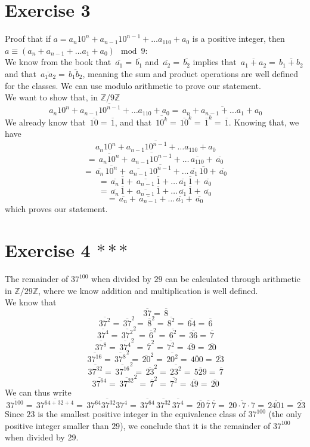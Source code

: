 \documentclass[12pt]{article}
\newcommand{\Z}{\mathbb{Z}}
\newcommand{\olsi}[1]{\,\overline{{#1}}}
\begin{document}
    \section*{Exercise 3}
    Proof that if $a = a_n10^n + a_{n-1}10^{n-1} + \dots a_110 + a_0$
    is a positive integer,
    then $a \equiv (a_n + a_{n-1} + \dots a_1 + a_0) \mod 9$: \\
    We know from the book that $\olsi{a_1} = \olsi{b_1}$
    and $\olsi{a_2} = \olsi{b_2}$
    implies that $\olsi{a_1+a_2} = \olsi{b_1 + b_2}$
    and that $\olsi{a_1a_2} = \olsi{b_1b_2}$,
    meaning the sum and product operations are well defined
    for the classes.
    We can use modulo arithmetic to prove our statement. \\
    We want to show that, in $\Z/9\Z$
    \[  \olsi{a_n10^n + a_{n-1}10^{n-1} + \dots a_110 + a_0}
    = \olsi{a_n + a_{n-1} + \dots a_1 + a_0} \]
    We already know that $\olsi{10} = \olsi{1}$,
    and that $\olsi{10^k} = \olsi{10}^k = \olsi{1}^k = \olsi{1}$.
    Knowing that, we have
    \[  \olsi{a_n10^n + a_{n-1}10^{n-1} + \dots a_110 + a_0} \]
    \[ = \olsi{a_n10^n} +  \olsi{a_{n-1}10^{n-1}}
    + \dots  \olsi{a_110} +  \olsi{a_0} \]
    \[ = \olsi{a_n}\olsi{10^n} +  \olsi{a_{n-1}}\olsi{10^{n-1}}
    + \dots  \olsi{a_1}\olsi{10} +  \olsi{a_0} \]
    \[ = \olsi{a_n}\olsi{1} +  \olsi{a_{n-1}}\olsi{1}
    + \dots  \olsi{a_1}\olsi{1} +  \olsi{a_0} \]
    \[ = \olsi{a_n}\olsi{1} +  \olsi{a_{n-1}}\olsi{1}
    + \dots  \olsi{a_1}\olsi{1} +  \olsi{a_0} \]
    \[ = \olsi{a_n} +  \olsi{a_{n-1}}
    + \dots  \olsi{a_1} +  \olsi{a_0} \]
    which proves our statement. \\

    \section*{Exercise 4 $***$}
    The remainder of $37^{100}$ when divided by $29$
    can be calculated through arithmetic in $\Z/29\Z$,
    where we know addition and multiplication is well defined. \\
    We know that
    \[ \olsi{37} = \olsi{8} \]
    \[ \olsi{37^2} = \olsi{37}^2 = \olsi{8}^2
    = \olsi{8^2} = \olsi{64} = \olsi{6} \]
    \[ \olsi{37^4} = \olsi{37^2}^2 = \olsi{6}^2
    = \olsi{6^2} = \olsi{36} = \olsi{7} \]
    \[ \olsi{37^8} = \olsi{37^4}^2 = \olsi{7}^2
    = \olsi{7^2} = \olsi{49} = \olsi{20} \]
    \[ \olsi{37^{16}} = \olsi{37^8}^2 = \olsi{20}^2
    = \olsi{20^2} = \olsi{400} = \olsi{23} \]
    \[ \olsi{37^{32}} = \olsi{37^{16}}^2 = \olsi{23}^2
    = \olsi{23^2} = \olsi{529} = \olsi{7} \]
    \[ \olsi{37^{64}} = \olsi{37^{32}}^2 = \olsi{7}^2
    = \olsi{7^2} = \olsi{49} = \olsi{20} \]
    We can thus write
    \[ \olsi{37^{100}} = \olsi{37^{64 + 32 + 4}}
    = \olsi{37^{64}37^{32}37^{4}}
    = \olsi{37^{64}}\olsi{37^{32}}\olsi{37^{4}} 
    = \olsi{20}\olsi{7}\olsi{7}
    = \olsi{20 \cdot 7 \cdot 7}
    = \olsi{2401} = \olsi{23} \]
    Since $23$ is the smallest positive integer in the equivalence
    class of $37^{100}$
    (the only positive integer smaller than $29$),
    we conclude that it is the remainder of $37^{100}$
    when divided by $29$. \\
\end{document}
